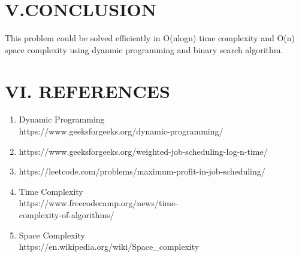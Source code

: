 \documentclass[10pt]{article}
\begin{document}
\begin{multicols*}{2}
\section*{V.CONCLUSION}

This problem could be solved efficiently in O(nlogn) time complexity and O(n) space complexity using dyanmic programming and binary search algorithm.

\section*{VI. REFERENCES}

\begin{enumerate}
\item Dynamic Programming\\
https://www.geeksforgeeks.org/dynamic-programming/
\item
https://www.geeksforgeeks.org/weighted-job-scheduling-log-n-time/
\item
https://leetcode.com/problems/maximum-profit-in-job-scheduling/
\item Time Complexity\\
https://www.freecodecamp.org/news/time-\\complexity-of-algorithms/
\item Space Complexity\\
https://en.wikipedia.org/wiki/Space\_complexity
\end{enumerate}
\end{multicols*}

	
\end{document}
